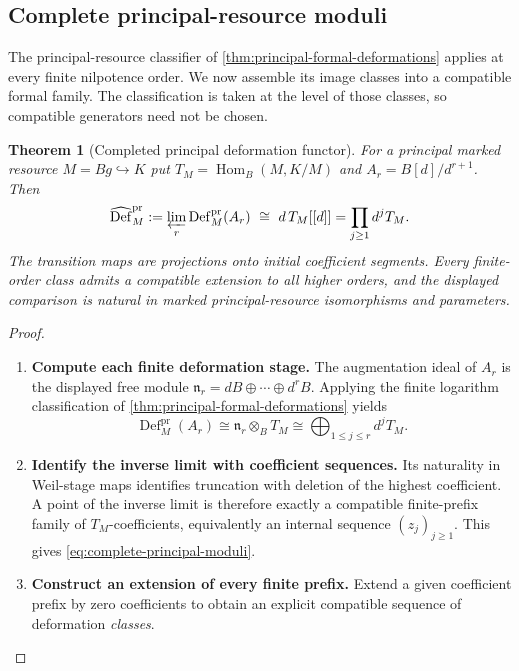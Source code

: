\documentclass[11pt,a4paper]{article}
\numberwithin{algorithm}{section}
\numberwithin{equation}{section}
\newtheorem{theorem}{Theorem}[section]
\theoremstyle{definition}
\theoremstyle{remark}
\theoremstyle{plain}
\newcommand{\incl}{\hookrightarrow}
\newcommand{\Hom}{\operatorname{Hom}}
\theoremstyle{definition}
\theoremstyle{plain}
\begin{document}
\subsection{Complete principal-resource moduli}
\label{sec:complete-principal-resource-moduli}
The principal-resource classifier of
\cref{thm:principal-formal-deformations} applies at every finite
nilpotence order. We now assemble its image classes into a
compatible formal family. The classification is taken at the
level of those classes, so compatible generators need not be
chosen.

\begin{theorem}[Completed principal deformation functor]
\label{thm:complete-principal-moduli}
For a principal marked resource $M=Bg\incl K$ put
$T_M=\Hom_B(M,K/M)$ and $A_r=B[d]/d^{r+1}$.  Then
\begin{equation}\label{eq:complete-principal-moduli}
 \widehat{\operatorname{Def}}^{\mathrm{pr}}_M
 :=\varprojlim_r\operatorname{Def}^{\mathrm{pr}}_M(A_r)
 \ \cong\ d\,T_M[[d]]
 =\prod_{j\ge1}d^jT_M.
\end{equation}
The transition maps are projections onto initial coefficient
segments.  Every finite-order class admits a compatible extension
to all higher orders, and the displayed comparison is natural in
marked principal-resource isomorphisms and parameters.
\end{theorem}
\begin{proof}\leavevmode
\begin{enumerate}[leftmargin=*,align=left]
\item \textbf{Compute each finite deformation stage.}
The augmentation ideal of $A_r$ is the displayed free module
$\mathfrak n_r=dB\oplus\cdots\oplus d^rB$.  Applying the
finite logarithm classification of
\cref{thm:principal-formal-deformations} yields
\[
 \operatorname{Def}^{\mathrm{pr}}_M(A_r)
 \cong\mathfrak n_r\otimes_BT_M
 \cong\bigoplus_{1\le j\le r}d^jT_M.
\]

\item \textbf{Identify the inverse limit with coefficient sequences.}
Its naturality in Weil-stage maps identifies truncation with
deletion of the highest coefficient.  A point of the inverse limit
is therefore exactly a compatible finite-prefix family of
$T_M$-coefficients, equivalently an internal sequence
$(z_j)_{j\ge1}$.  This gives \eqref{eq:complete-principal-moduli}.

\item \textbf{Construct an extension of every finite prefix.}
Extend a given coefficient prefix by zero coefficients to obtain
an explicit compatible sequence of deformation \emph{classes}.
\end{enumerate}
\end{proof}
\end{document}
